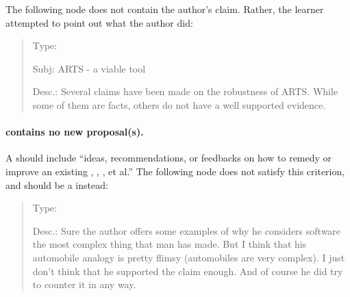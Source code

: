 The following node does not contain the author's claim. Rather, the learner
attempted to point out what the author did:

\small
\begin{quote}
  \begin{itemizenoindent}

    \item {\sf Type}: 
 
    \item {\sf Subj}: ARTS - a viable tool
 
    \item {\sf Desc.}: Several claims have been made on the
      robustness of ARTS. While some of them are facts, others do not
      have a well supported evidence.

 \end{itemizenoindent}
\end{quote}
\normalsize
{}


\paragraph{ contains no new proposal(s).}

A  should include ``ideas, recommendations, or
feedbacks on how to remedy or improve an existing ,
, , et al.'' The following node
does not satisfy this criterion, and should be a 
instead:

\small
\begin{quote}
  \begin{itemizenoindent}
  \item {\sf Type:\/} 
    
  \item {\sf Desc.}: Sure the author offers some examples of why he
    considers software the most complex thing that man has made.  But I think
    that his automobile analogy is pretty flimsy (automobiles are very
    complex).  I just don't think that he supported the claim enough.  And
    of course he did try to counter it in any way.
  \end{itemizenoindent}
\end{quote}
\normalsize
{}


